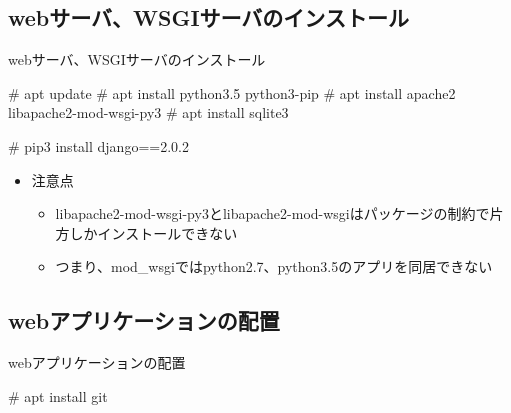 \subsection{webサーバ、WSGIサーバのインストール}

\begin{frame}[containsverbatim]{webサーバ、WSGIサーバのインストール}
 
\begin{commandlinesmall}
# apt update
# apt install python3.5 python3-pip
# apt install apache2 libapache2-mod-wsgi-py3
# apt install sqlite3
\end{commandlinesmall}

\begin{commandlinesmall}
# pip3 install django==2.0.2
\end{commandlinesmall}

\begin{itemize}
\item 注意点
  \begin{itemize}
  \item libapache2-mod-wsgi-py3とlibapache2-mod-wsgiはパッケージの制約で片方しかインストールできない
  \item つまり、mod\_wsgiではpython2.7、python3.5のアプリを同居できない
  \end{itemize}
\end{itemize}

\end{frame}


\subsection{webアプリケーションの配置}

\begin{frame}[containsverbatim]{webアプリケーションの配置}

\begin{commandlinesmall}
# apt install git
\end{commandlinesmall}


\end{frame}


